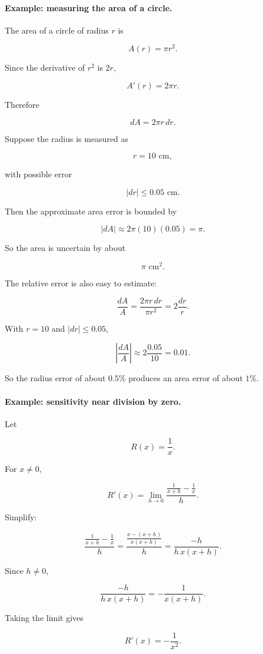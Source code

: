 \paragraph{Example: measuring the area of a circle.}
The area of a circle of radius \(r\) is

\[
A(r)=\pi r^2.
\]

Since the derivative of \(r^2\) is \(2r\),

\[
A'(r)=2\pi r.
\]

Therefore

\[
dA=2\pi r\,dr.
\]

Suppose the radius is measured as

\[
r=10\text{ cm},
\]

with possible error

\[
|dr|\le0.05\text{ cm}.
\]

Then the approximate area error is bounded by

\[
|dA|
\approx
2\pi(10)(0.05)
=
\pi.
\]

So the area is uncertain by about

\[
\pi\text{ cm}^2.
\]

The relative error is also easy to estimate:

\[
\frac{dA}{A}
=
\frac{2\pi r\,dr}{\pi r^2}
=
2\frac{dr}{r}.
\]

With \(r=10\) and \(|dr|\le0.05\),

\[
\left|\frac{dA}{A}\right|
\approx
2\frac{0.05}{10}
=
0.01.
\]

So the radius error of about \(0.5\%\) produces an area error of about \(1\%\).

\paragraph{Example: sensitivity near division by zero.}
Let

\[
R(x)=\frac1x.
\]

For \(x\neq0\),

\[
R'(x)
=
\lim_{h\to0}\frac{\frac1{x+h}-\frac1x}{h}.
\]

Simplify:

\[
\frac{\frac1{x+h}-\frac1x}{h}
=
\frac{\frac{x-(x+h)}{x(x+h)}}{h}
=
\frac{-h}{h\,x(x+h)}.
\]

Since \(h\neq0\),

\[
\frac{-h}{h\,x(x+h)}
=
-\frac{1}{x(x+h)}.
\]

Taking the limit gives

\[
R'(x)=-\frac1{x^2}.
\]

